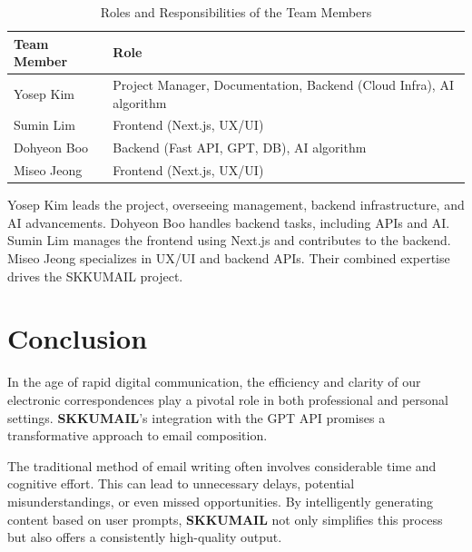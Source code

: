\documentclass[12pt]{article}
\begin{document}
\begin{table}[ht]
	\centering
	\begin{tabularx}{\textwidth}{|X|X|}
		\hline
		\rowcolor{gray!30}
		Team Member & Role                                                                \\
		\hline
		Yosep Kim   & Project Manager, Documentation, Backend (Cloud Infra), AI algorithm \\
		\hline
		Sumin Lim   & Frontend (Next.js, UX/UI)                                           \\
		\hline
		Dohyeon Boo & Backend (Fast API, GPT, DB), AI algorithm                           \\
		
		\hline
		Miseo Jeong & Frontend (Next.js, UX/UI)                                           \\
		\hline
	\end{tabularx}
	\caption{Roles and Responsibilities of the Team Members}
\end{table}

Yosep Kim leads the project, overseeing management, backend infrastructure, and AI advancements. Dohyeon Boo handles backend tasks, including APIs and AI. Sumin Lim manages the frontend using Next.js and contributes to the backend. Miseo Jeong specializes in UX/UI and backend APIs. Their combined expertise drives the SKKUMAIL project.

\titleformat{\section}[block]{\normalfont\Large\bfseries\color{darkblue}}{\thesection}{1em}{}

\section*{Conclusion}

In the age of rapid digital communication, the efficiency and clarity of our electronic correspondences play a pivotal role in both professional and personal settings. \textbf{SKKUMAIL}'s integration with the GPT API promises a transformative approach to email composition.

The traditional method of email writing often involves considerable time and cognitive effort. This can lead to unnecessary delays, potential misunderstandings, or even missed opportunities. By intelligently generating content based on user prompts, \textbf{SKKUMAIL} not only simplifies this process but also offers a consistently high-quality output.
\end{document}
